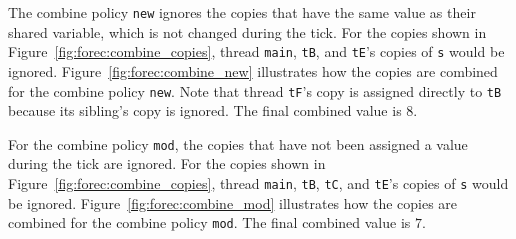 The combine policy \verb$new$ ignores the copies that have 
the same
value as their shared variable, which is not changed during 
the tick. For the copies shown
in Figure~\ref{fig:forec:combine_copies}, thread \verb$main$, \texttt{tB},
and \verb$tE$'s copies of \verb$s$ would be ignored.
Figure~\ref{fig:forec:combine_new} illustrates how the
copies are combined for the combine policy \verb$new$. Note
that thread \verb$tF$'s copy is assigned directly to
\verb$tB$ because its sibling's copy is ignored. The final
combined value is $8$.

For the combine policy \verb$mod$, the copies that have not
been assigned a value during the tick are ignored. For the
copies shown in Figure~\ref{fig:forec:combine_copies},
thread \verb$main$, \texttt{tB}, \verb$tC$, and \verb$tE$'s copies of 
\verb$s$ would be ignored.
Figure~\ref{fig:forec:combine_mod} illustrates how the
copies are combined for the combine policy \verb$mod$. The
final combined value is $7$.



